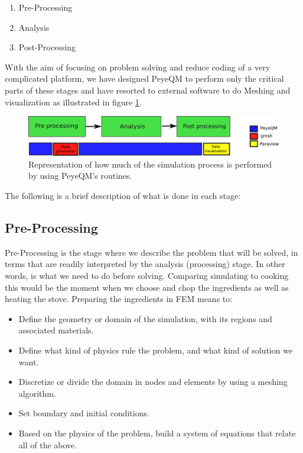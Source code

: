 \begin{enumerate}
\item Pre-Processing
\item Analysis
\item Post-Processing
\end{enumerate}

With the aim of focusing on problem solving and reduce coding of a very complicated platform, we have designed PeyeQM to perform only the critical parts of these stages and have resorted to external software to do Meshing and visualization as illustrated in figure \ref{fig:stages_comp}. 
%
\begin{figure}
\centering
\includegraphics[scale=.3]{./img/stages_comparison.pdf}
\caption{Representation of how much of the simulation process is performed by using PeyeQM's routines.}
\label{fig:stages_comp}
\end{figure}  
%
The following is a brief description of what is done in each stage:

\subsection{Pre-Processing}
Pre-Processing is the stage where we describe the problem that will be solved, in terms that are readily interpreted by the analysis (processing) stage. In other words, is what we need to do before solving. Comparing simulating to cooking this would be the moment when we choose and chop the ingredients as well as heating the stove. Preparing the ingredients in FEM means to:
\begin{itemize}
\item Define the geometry or domain of the simulation, with its regions and associated materials.
\item Define what kind of physics rule the problem, and what kind of solution we want.
\item Discretize or divide the domain in nodes and elements by using a meshing algorithm. 
\item Set boundary and initial conditions.
\item Based on the physics of the problem, build a system of equations that relate all of the above.
\end{itemize} 
 
